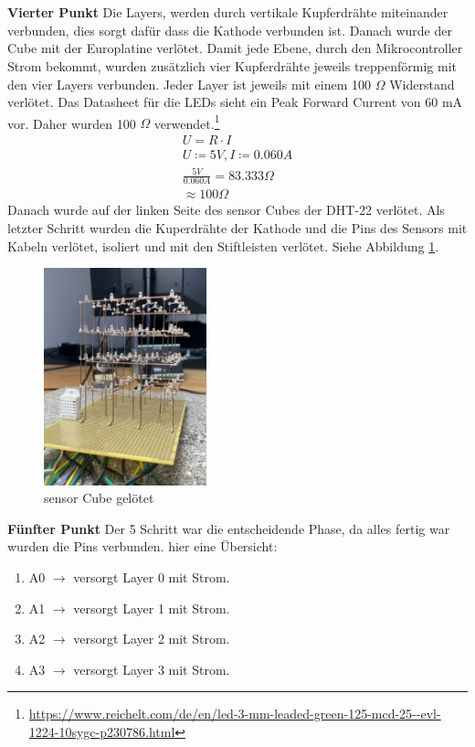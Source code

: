 \documentclass{article}
\begin{document}
\\ \\
\textbf{Vierter Punkt} Die Layers, werden durch vertikale Kupferdrähte miteinander verbunden, dies sorgt dafür dass die Kathode verbunden ist. Danach wurde der Cube mit der Europlatine verlötet. Damit jede Ebene, durch den Mikrocontroller Strom bekommt, wurden zusätzlich vier Kupferdrähte jeweils treppenförmig mit den vier Layers verbunden. Jeder Layer ist jeweils mit einem 100 $\Omega$ Widerstand verlötet. Das Datasheet für die LEDs sieht ein Peak Forward Current von 60 mA vor. Daher wurden 100 $\Omega$ verwendet.\footnote{\url{https://www.reichelt.com/de/en/led-3-mm-leaded-green-125-mcd-25--evl-1224-10sygc-p230786.html}} \begin{align}
U = R \cdot I \\
U \coloneqq 5 V, I \coloneqq 0.060 A \\
\frac{5V}{0.060A} = 83.333 \Omega \\
\approx 100 \Omega
\end{align}
Danach wurde auf der linken Seite des sensor Cubes der DHT-22 verlötet. Als letzter Schritt wurden die Kuperdrähte der Kathode und die Pins des Sensors mit Kabeln verlötet, isoliert und mit den Stiftleisten verlötet. Siehe Abbildung \ref{fig:kathode}. 
\begin{figure}[!h]
\begin{center}
\includegraphics[width=0.42\textwidth]{bilder/cube.jpeg}
\caption{sensor Cube gelötet}
\label{fig:kathode}
\end{center}
\end{figure}\newpage
\noindent \textbf{Fünfter Punkt}
Der 5 Schritt war die entscheidende Phase, da alles fertig war wurden die Pins verbunden. hier eine Übersicht:
\begin{enumerate}
\item A0 $\rightarrow$ versorgt Layer 0 mit Strom.
\item A1 $\rightarrow$ versorgt Layer 1 mit Strom.
\item A2 $\rightarrow$ versorgt Layer 2 mit Strom.
\item A3 $\rightarrow$ versorgt Layer 3 mit Strom.
\end{enumerate}
\end{document}
